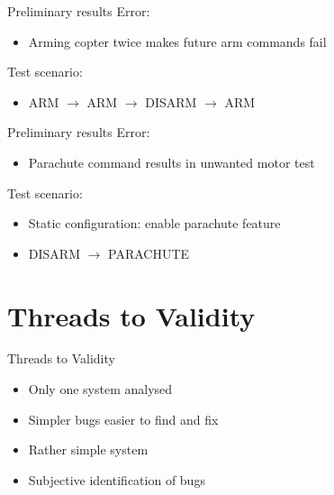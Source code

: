	\begin{frame}{Preliminary results}
		Error:
		\begin{itemize}
			\item[] Arming copter twice makes future arm commands fail
		\end{itemize}

		\pause
		Test scenario:
		\begin{itemize}
			\item[] ARM $\rightarrow$ ARM $\rightarrow$ DISARM $\rightarrow$ ARM
		\end{itemize}
	\end{frame}

	\begin{frame}{Preliminary results}
		Error:
		\begin{itemize}
			\item[] Parachute command results in unwanted motor test
		\end{itemize}

		\pause
		Test scenario:
		\begin{itemize}
			\item[] Static configuration: enable parachute feature
			\item[] DISARM $\rightarrow$ PARACHUTE
		\end{itemize}
	\end{frame}

\section{Threads to Validity}
	\begin{frame}{Threads to Validity}
		\begin{itemize}
			\item Only one system analysed
			\item Simpler bugs easier to find and fix
			\item Rather simple system
			\item Subjective identification of bugs
		\end{itemize}
	\end{frame}


